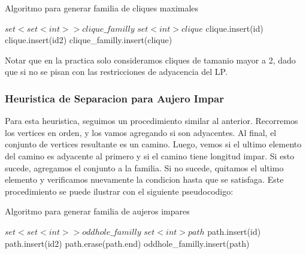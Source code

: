 \begin{algorithm}
\caption{Algoritmo para generar familia de cliques maximales}
\begin{algorithmic}[1]
\State $set<set<int>> clique\_familly$
	\State $set<int> clique$
	\State clique.insert(id)
			\State clique.insert(id2)
		\EndIf
	\EndFor
		\State clique\_familly.insert(clique)
	\EndIf
\EndFor

\EndProcedure
\end{algorithmic}
\end{algorithm}

Notar que en la practica solo consideramos cliques de tamanio mayor a 2, dado que si no se pisan con las restricciones de adyacencia del LP.

\subsubsection{Heuristica de Separacion para Aujero Impar}

Para esta heuristica, seguimos un procedimiento similar al anterior. Recorremos los vertices en orden, y los vamos agregando si son adyacentes. Al final, el conjunto de vertices resultante es un camino. Luego, vemos si el ultimo elemento del camino es adyacente al primero y si el camino tiene longitud impar. Si esto sucede, agregamos el conjunto a la familia. Si no sucede, quitamos el ultimo elemento y verificamos nuevamente la condicion hasta que se satisfaga. Este procedimiento se puede ilustrar con el siguiente pseudocodigo:

\begin{algorithm}
\caption{Algoritmo para generar familia de aujeros impares}
\begin{algorithmic}[1]
\State $set<set<int>> oddhole\_familly$
	\State $set<int> path$
	\State path.insert(id)
			\State path.insert(id2)
		\EndIf
	\EndFor
		\State path.erase(path.end)
	\EndWhile
		\State oddhole\_familly.insert(path)
	\EndIf
\EndFor

\EndProcedure
\end{algorithmic}
\end{algorithm}